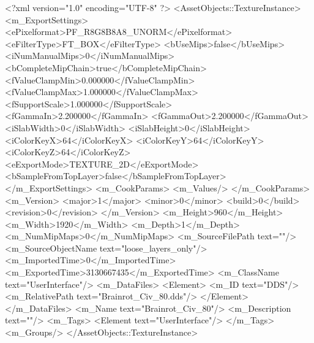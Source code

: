 <?xml version="1.0" encoding="UTF-8" ?>
<AssetObjects::TextureInstance>
	<m_ExportSettings>
		<ePixelformat>PF_R8G8B8A8_UNORM</ePixelformat>
		<eFilterType>FT_BOX</eFilterType>
		<bUseMips>false</bUseMips>
		<iNumManualMips>0</iNumManualMips>
		<bCompleteMipChain>true</bCompleteMipChain>
		<fValueClampMin>0.000000</fValueClampMin>
		<fValueClampMax>1.000000</fValueClampMax>
		<fSupportScale>1.000000</fSupportScale>
		<fGammaIn>2.200000</fGammaIn>
		<fGammaOut>2.200000</fGammaOut>
		<iSlabWidth>0</iSlabWidth>
		<iSlabHeight>0</iSlabHeight>
		<iColorKeyX>64</iColorKeyX>
		<iColorKeyY>64</iColorKeyY>
		<iColorKeyZ>64</iColorKeyZ>
		<eExportMode>TEXTURE_2D</eExportMode>
		<bSampleFromTopLayer>false</bSampleFromTopLayer>
	</m_ExportSettings>
	<m_CookParams>
		<m_Values/>
	</m_CookParams>
	<m_Version>
		<major>1</major>
		<minor>0</minor>
		<build>0</build>
		<revision>0</revision>
	</m_Version>
	<m_Height>960</m_Height>
	<m_Width>1920</m_Width>
	<m_Depth>1</m_Depth>
	<m_NumMipMaps>0</m_NumMipMaps>
	<m_SourceFilePath text=""/>
	<m_SourceObjectName text="loose_layers_only"/>
	<m_ImportedTime>0</m_ImportedTime>
	<m_ExportedTime>3130667435</m_ExportedTime>
	<m_ClassName text="UserInterface"/>
	<m_DataFiles>
		<Element>
			<m_ID text="DDS"/>
			<m_RelativePath text="Brainrot_Civ_80.dds"/>
		</Element>
	</m_DataFiles>
	<m_Name text="Brainrot_Civ_80"/>
	<m_Description text=""/>
	<m_Tags>
		<Element text="UserInterface"/>
	</m_Tags>
	<m_Groups/>
</AssetObjects::TextureInstance>

